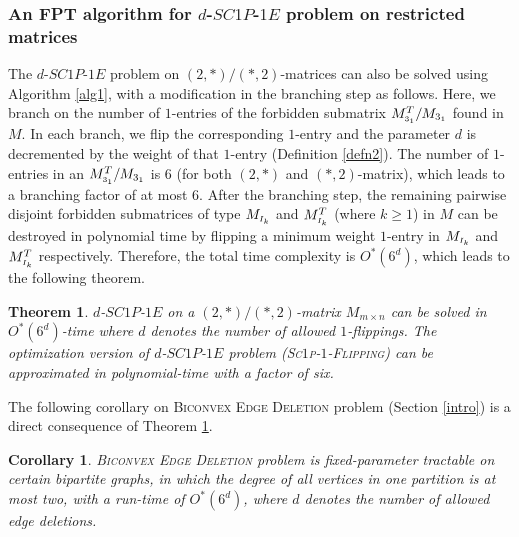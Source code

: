 \documentclass[review, 1p]{elsarticle}
\newtheorem{theorem}{Theorem}
\newtheorem{corollary}{Corollary}
\begin{document}
\subsubsection{\textup{\textbf{An FPT algorithm for $d$-$SC1P$-$1E$ problem on restricted matrices}}}\label{restrctd1}
The $d$-$SC1P$-$1E$ problem on $(2,*)/(*,2)$-matrices can also be solved  using Algorithm \ref{alg1}, with a modification in the branching step as follows. Here, we branch on the number of $1$-entries of the forbidden submatrix $M^{T}_{\mathsmaller {3_{1}}}/M_{3_{1}}$  found in $M$. In each branch, we flip the corresponding $1$-entry and the parameter $d$ is decremented by the weight of that $1$-entry (Definition \ref{defn2}). The number of $1$-entries in an $M^{T}_{\mathsmaller{3_{1}}}/M_{3_{1}}$ is $6$ (for both $(2,*)$ and $(*,2)$-matrix), which leads to a branching factor of at most $6$. After the branching step, the remaining pairwise disjoint forbidden submatrices of type $M_{\mathsmaller I_{k}}$ and $M^{T}_{\mathsmaller{I_{k}}}$ (where $k \geq 1$) in $M$ can be destroyed in polynomial time by flipping a minimum weight $1$-entry in $M_{\mathsmaller I_{k}}$ and  $M^{T}_{\mathsmaller{I_{k}}}$ respectively. Therefore, the total time complexity is $O^{*}(6^{d})$, which leads to the following theorem.
\begin{theorem}\label{thm18}
$d$-$SC1P$-$1E$ on a $(2,*)/(*,2)$-matrix $M_{m \times n}$ can be solved in  $O^{*}(6^{d})$-time where $d$ denotes the number of allowed $1$-flippings. The optimization version of $d$-$SC1P$-$1E$ problem (\textsc{Sc$1$p-$1$-Flipping}) can be approximated in polynomial-time with a factor of six. 
\end{theorem}
The following corollary on \textsc{Biconvex Edge Deletion} problem (Section \ref{intro}) is a direct consequence of Theorem \ref{thm18}.
\begin{corollary}
\textsc{Biconvex Edge Deletion} problem is fixed-parameter tractable on certain bipartite graphs, in which the degree of all vertices in one partition is at most two, with a run-time of $O^{*}(6^{d})$, where $d$ denotes the number of allowed edge deletions.
\end{corollary}
\end{document}

